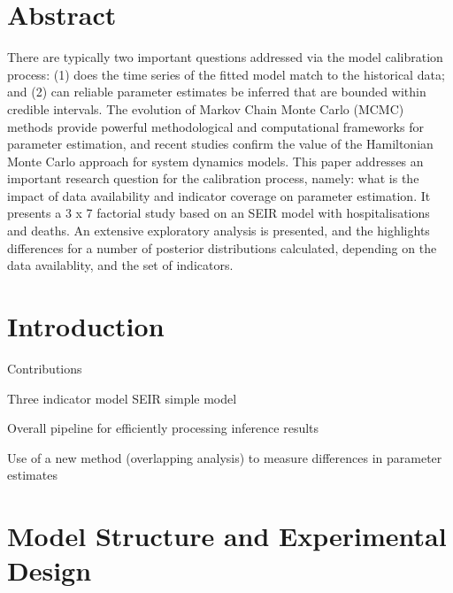 \documentclass[10pt,letterpaper]{article}
\begin{document}
\section*{Abstract}
There are typically two important questions addressed via the model calibration process: (1) does the time series of the fitted model match to the historical data; and (2) can reliable parameter estimates be inferred that are bounded within credible intervals. The evolution of Markov Chain Monte Carlo (MCMC) methods provide powerful methodological and computational frameworks for parameter estimation, and recent studies confirm the value of the Hamiltonian Monte Carlo approach for system dynamics models. This paper addresses an important research question for the calibration process, namely: what is the impact of data availability and indicator coverage on parameter estimation. It presents a 3 x 7 factorial study based on an SEIR model with hospitalisations and deaths. An extensive exploratory analysis is presented, and the highlights differences for a number of posterior distributions calculated, depending on the data availablity, and the set of indicators.



\linenumbers

\newpage

\hypertarget{introduction}{%
\section{Introduction}\label{introduction}}

Contributions

Three indicator model SEIR simple model

Overall pipeline for efficiently processing inference results

Use of a new method (overlapping analysis) to measure differences in parameter estimates

\hypertarget{model-structure-and-experimental-design}{%
\section{Model Structure and Experimental Design}\label{model-structure-and-experimental-design}}
\end{document}
